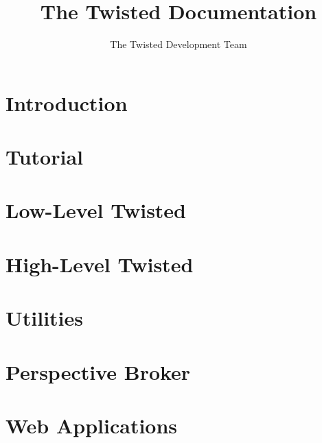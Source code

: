 \documentclass[oneside]{book}
\title{The Twisted Documentation}
\author{The Twisted Development Team}
\begin{document}
\maketitle
\tableofcontents

\chapter{Introduction}







\chapter{Tutorial}



\chapter{Low-Level Twisted }












\chapter{High-Level Twisted}









\chapter{Utilities}








\chapter{Perspective Broker}






\chapter{Web Applications}
\end{document}
